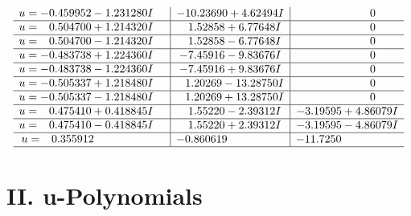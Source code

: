 \documentclass[1p]{elsarticle_modified}
\theoremstyle{definition}
\begin{document}
$$\begin{array}{c|c|c}
\begin{aligned}
u &= -0.459952 - 1.231280 I\end{aligned}
 & -10.23690 + 4.62494 I & \phantom{-0.000000 } 0 \\ \hline\begin{aligned}
u &= \phantom{-}0.504700 + 1.214320 I\end{aligned}
 & \phantom{-}1.52858 + 6.77648 I & \phantom{-0.000000 } 0 \\ \hline\begin{aligned}
u &= \phantom{-}0.504700 - 1.214320 I\end{aligned}
 & \phantom{-}1.52858 - 6.77648 I & \phantom{-0.000000 } 0 \\ \hline\begin{aligned}
u &= -0.483738 + 1.224360 I\end{aligned}
 & -7.45916 - 9.83676 I & \phantom{-0.000000 } 0 \\ \hline\begin{aligned}
u &= -0.483738 - 1.224360 I\end{aligned}
 & -7.45916 + 9.83676 I & \phantom{-0.000000 } 0 \\ \hline\begin{aligned}
u &= -0.505337 + 1.218480 I\end{aligned}
 & \phantom{-}1.20269 - 13.28750 I & \phantom{-0.000000 } 0 \\ \hline\begin{aligned}
u &= -0.505337 - 1.218480 I\end{aligned}
 & \phantom{-}1.20269 + 13.28750 I & \phantom{-0.000000 } 0 \\ \hline\begin{aligned}
u &= \phantom{-}0.475410 + 0.418845 I\end{aligned}
 & \phantom{-}1.55220 - 2.39312 I & -3.19595 + 4.86079 I \\ \hline\begin{aligned}
u &= \phantom{-}0.475410 - 0.418845 I\end{aligned}
 & \phantom{-}1.55220 + 2.39312 I & -3.19595 - 4.86079 I \\ \hline\begin{aligned}
u &= \phantom{-}0.355912\phantom{ +0.000000I}\end{aligned}
 & -0.860619\phantom{ +0.000000I} & -11.7250\phantom{ +0.000000I}\\
 \hline 
 \end{array}$$\newpage
\newpage\renewcommand{\arraystretch}{1}
\centering \section*{ II. u-Polynomials}
\end{document}
